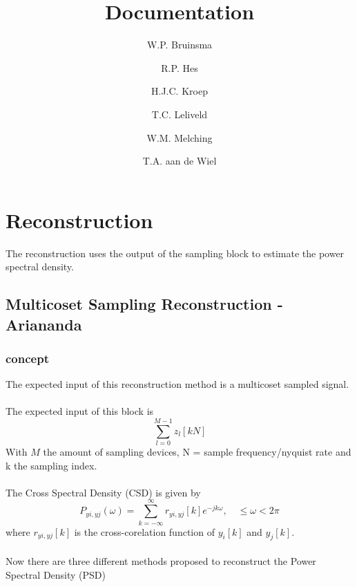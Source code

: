 \documentclass[report, oneside, a4paper, openany]{memoir}
\title{Documentation}
\author{W.P. Bruinsma \and R.P. Hes \and H.J.C. Kroep \and T.C. Leliveld \and W.M. Melching \and T.A. aan de Wiel}
\begin{document}
\chapter{Reconstruction}
The reconstruction uses the output of the sampling block to estimate the power spectral density.

\section{Multicoset Sampling Reconstruction -Ariananda}
\subsection{concept}
The expected input of this reconstruction method is a multicoset sampled signal.
\\ \\
The expected input of this block is
$$
\sum_{l=0}^{M-1}z_l[kN]
$$
With $M$ the amount of sampling devices, N = sample frequency/nyquist rate and k the sampling index.\\
\\
The Cross Spectral Density (CSD) is given by
$$
P_{yi,yj}(\omega) = \sum_{k=-\infty}^\infty r_{yi,yj}[k]e^{-jk\omega}, \quad  \leq \omega < 2\pi
$$ 
where $r_{yi,yj}[k]$ is the cross-corelation function of $y_i[k]$ and $y_j[k]$.\\
\\
Now there are three different methods proposed to reconstruct the Power Spectral Density (PSD)
\end{document}
